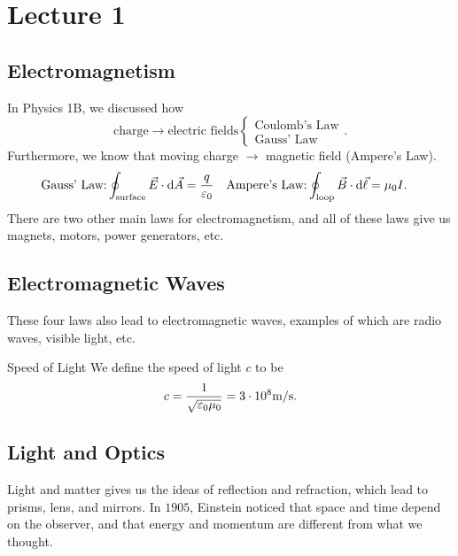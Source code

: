 \documentclass[class=article, crop=false]{standalone}
\begin{document}
  \section{Lecture 1}
  \subsection{Electromagnetism}
  In Physics 1B, we discussed how
  \[
    \text{charge}\to \text{electric fields} \begin{cases}\text{Coulomb's Law} \\
    \text{Gauss' Law}\end{cases}.
  \]
  Furthermore, we know that moving charge $\to$ magnetic field (Ampere's Law).
  \begin{align*}
    \text{Gauss' Law:} \oint_{\text{surface}}^{}\vec{E}\cdot \mathrm{d}\vec{A} &= \frac{q}{\varepsilon_0} & \text{Ampere's Law:} \oint_{\text{loop}}^{}\vec{B}\cdot\mathrm{d}\vec{\ell} &= \mu_0I.
  \end{align*}
  There are two other main laws for electromagnetism, and all of these laws give us magnets, motors, power generators, etc.
  \subsection{Electromagnetic Waves}
  These four laws also lead to electromagnetic waves, examples of which are radio waves, visible light, etc.
  \begin{definition}{Speed of Light}
    We define the speed of light $c$ to be
    \[
      c = \frac{1}{\sqrt{\varepsilon_0\mu_0}} = 3\cdot 10^8 \text{m/s}.
    \]
  \end{definition}
  \subsection{Light and Optics}
  Light and matter gives us the ideas of reflection and refraction, which lead to prisms, lens, and mirrors. In $1905$, Einstein noticed that space and time depend on the observer, and that energy and momentum are different from what we thought.
\end{document}
